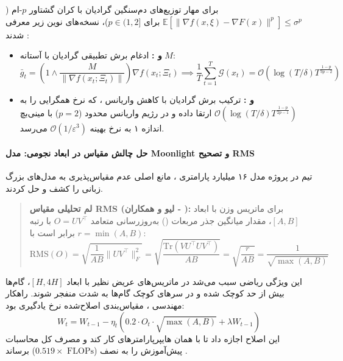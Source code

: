 برای مهار توزیع‌های دم‌سنگین گرادیان با کران گشتاور $p$-ام ($\mathbb{E}[\|\nabla f(x, \xi) - \nabla F(x)\|^p] \le \sigma^p$ برای $p \in (1, 2]$)، نسخه‌های نوین زیر معرفی شدند \cite{sfyraki2026lions}:
\begin{itemize}
    \item \textbf{ و :} ادغام برش تطبیقی گرادیان با آستانه $M$:
    \begin{equation}
        \bar{g}_t = \left(1 \wedge \frac{M}{\|\nabla f(x_t; \Xi_t)\|}\right)\nabla f(x_t; \Xi_t) \implies \frac{1}{T}\sum_{t=1}^T \mathcal{G}(x_t) = \mathcal{O}\left(\log(T/\delta) T^{\frac{1-p}{3p-2}}\right)
    \end{equation}
    \item \textbf{ و :} ترکیب برش گرادیان با کاهش واریانس ، که نرخ همگرایی را به $\mathcal{O}\left(\log(T/\delta) T^{\frac{1-p}{2p-1}}\right)$ ارتقا داده و در رژیم واریانس محدود ($p=2$) با مینی‌بچ اندازه ۱ به نرخ بهینه $\mathcal{O}(1/\varepsilon^3)$ می‌رسد.
\end{itemize}

\paragraph*{حل چالش مقیاس در ابعاد نجومی: مدل Moonlight و تصحیح RMS}
تیم  در پروژه مدل ۱۶ میلیارد پارامتری  \cite{liu2025muon}، مانع اصلی عدم مقیاس‌پذیری  به مدل‌های بزرگ زبانی را کشف و حل کردند. 

\begin{quote}
\textbf{لم تحلیلی مقیاس RMS (لیو و همکاران \cite{liu2025muon} - ):}
برای ماتریس وزن با ابعاد $[A, B]$، مقدار میانگین جذر مربعات () به‌روزرسانی متعامد $O = UV^\top$ با رتبه $r = \min(A, B)$ برابر است با:
\begin{equation}
    \text{RMS}(O) = \sqrt{\frac{1}{AB}\|UV^\top\|_F^2} = \sqrt{\frac{\text{Tr}(V U^\top U V^\top)}{AB}} = \sqrt{\frac{r}{AB}} = \frac{1}{\sqrt{\max(A, B)}}
\end{equation}
\end{quote}
این ویژگی ریاضی سبب می‌شد در ماتریس‌های عریض نظیر  با ابعاد $[H, 4H]$، گام‌ها بیش از حد کوچک شده و در سر‌های کوچک  گام‌ها به شدت منفجر شوند. راهکار مهندسی ، مقیاس‌بندی اصلاح‌شده نرخ یادگیری بود:
\begin{equation}
    W_t = W_{t-1} - \eta_t \left( 0.2 \cdot O_t \cdot \sqrt{\max(A, B)} + \lambda W_{t-1} \right)
\end{equation}
این اصلاح اجازه داد تا  با همان هایپرپارامترهای  کار کند و مصرف کل محاسبات پیش‌آموزش را به نصف ($0.519\times \text{ FLOPs}$) برساند \cite{liu2025muon}.


